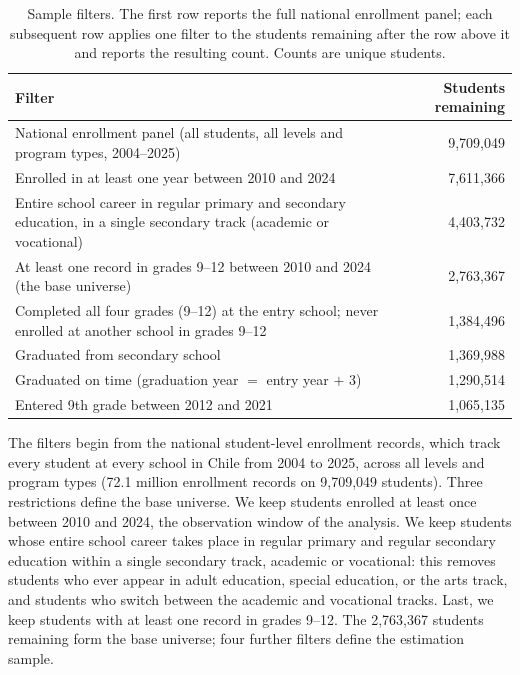\begin{table}[ht]
    \centering
    \caption{Sample filters. The first row reports the full national enrollment panel; each subsequent row applies one filter to the students remaining after the row above it and reports the resulting count. Counts are unique students.}
    \label{tab: panel filters}
    \small
    \begin{tabular}{p{11.8cm}r}
    \toprule
    Filter & Students remaining \\
    \midrule
    National enrollment panel (all students, all levels and program types, 2004--2025) & 9,709,049 \\
    Enrolled in at least one year between 2010 and 2024 & 7,611,366 \\
    Entire school career in regular primary and secondary education, in a single secondary track (academic or vocational) & 4,403,732 \\
    At least one record in grades 9--12 between 2010 and 2024 (the base universe) & 2,763,367 \\
    Completed all four grades (9--12) at the entry school; never enrolled at another school in grades 9--12 & 1,384,496 \\
    Graduated from secondary school & 1,369,988 \\
    Graduated on time (graduation year $=$ entry year $+$ 3) & 1,290,514 \\
    Entered 9th grade between 2012 and 2021 & 1,065,135 \\
    \bottomrule
    \end{tabular}
\end{table}

The filters begin from the national student-level enrollment records, which track every student at every school in Chile from 2004 to 2025, across all levels and program types (72.1 million enrollment records on 9,709,049 students). Three restrictions define the base universe. We keep students enrolled at least once between 2010 and 2024, the observation window of the analysis. We keep students whose entire school career takes place in regular primary and regular secondary education within a single secondary track, academic or vocational: this removes students who ever appear in adult education, special education, or the arts track, and students who switch between the academic and vocational tracks. Last, we keep students with at least one record in grades 9--12. The 2,763,367 students remaining form the base universe; four further filters define the estimation sample.

